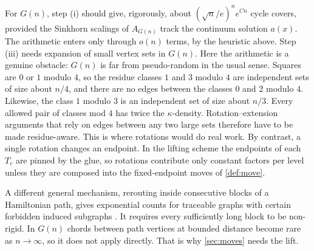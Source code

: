 \documentclass[11pt]{amsart}
\theoremstyle{definition}
\begin{document}
For $G(n)$, step (i) should give, rigorously, about $(\sqrt n/e)^n e^{Cn}$ cycle
covers, provided the Sinkhorn scalings of $A_{G(n)}$ track the continuum solution $a(x)$.
The arithmetic enters only through $o(n)$ terms, by the heuristic above. Step (iii)
needs expansion of small vertex sets in $G(n)$. Here the arithmetic is a genuine obstacle: $G(n)$ is far from
pseudo-random in the usual sense. Squares are $0$ or $1$ modulo $4$, so the residue
classes $1$ and $3$ modulo $4$ are independent sets of size about $n/4$, and there are no
edges between the classes $0$ and $2$ modulo $4$. Likewise, the class $1$ modulo $3$ is
an independent set of size about $n/3$. Every allowed pair of classes mod $4$ has twice the
$\kappa$-density. Rotation--extension arguments that rely on edges between any two
large sets therefore have to be made residue-aware. This is where rotations would do
real work.
By contrast, a single rotation changes an endpoint. In the lifting scheme the
endpoints of each $T_c$ are pinned by the glue, so rotations contribute only constant
factors per level unless they are composed into the fixed-endpoint moves of
\cref{def:move}.

A different general mechanism, rerouting inside consecutive blocks of a
Hamiltonian path, gives exponential counts for traceable graphs with certain forbidden
induced subgraphs \cite{JookenZamfirescu}. It requires every sufficiently long block
to be non-rigid. In $G(n)$ chords between path vertices at bounded distance become rare
as $n\to\infty$, so it does not apply directly. That is why \cref{sec:moves} needs
the lift.


\end{document}
